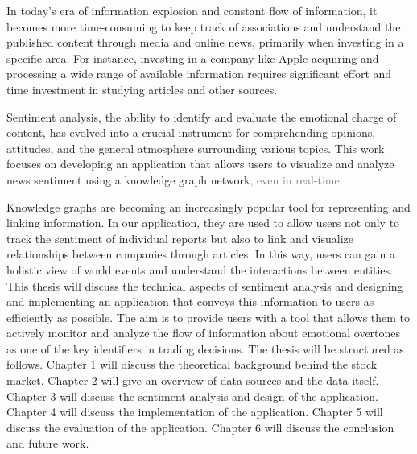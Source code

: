 

In today's era of information explosion and constant flow of information, it becomes more time-consuming to keep track of associations and understand the published content through media and online news, primarily when investing in a specific area. For instance, investing in a company like Apple acquiring and processing a wide range of available information requires significant effort and time investment in studying articles and other sources. 

Sentiment analysis, the ability to identify and evaluate the emotional charge of content, has evolved into a crucial instrument for comprehending opinions, attitudes, and the general atmosphere surrounding various topics. This work focuses on developing an application that allows users to visualize and analyze news sentiment using a knowledge graph network\textcolor{gray}{, even in real-time}.

Knowledge graphs are becoming an increasingly popular tool for representing and linking information. In our application, they are used to allow users not only to track the sentiment of individual reports but also to link and visualize relationships between companies through articles. In this way, users can gain a holistic view of world events and understand the interactions between entities.
This thesis will discuss the technical aspects of sentiment analysis and designing and implementing an application that conveys this information to users as efficiently as possible.  The aim is to provide users with a tool that allows them to actively monitor and analyze the flow of information about emotional overtones as one of the key identifiers in trading decisions. The thesis will be structured as follows. Chapter 1 will discuss the theoretical background behind the stock market. Chapter 2 will give an overview of data sources and the data itself. Chapter 3 will discuss the sentiment analysis and design of the application. Chapter 4 will discuss the implementation of the application. Chapter 5 will discuss the evaluation of the application. Chapter 6 will discuss the conclusion and future work.
